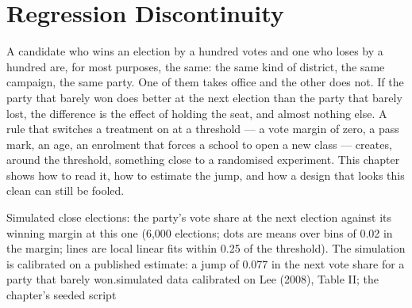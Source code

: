 \chapter{Regression Discontinuity}\label{ch:b3:regression-discontinuity}

A candidate who wins an election by a hundred votes and one who loses by a
hundred are, for most purposes, the same: the same kind of district, the same
campaign, the same party. One of them takes office and the other does not. If
the party that barely won does better at the next election than the party that
barely lost, the difference is the effect of holding the seat, and almost
nothing else. A rule that switches a treatment on at a threshold --- a vote
margin of zero, a pass mark, an age, an enrolment that forces a school to open a
new class --- creates, around the threshold, something close to a randomised
experiment. This chapter shows how to read it, how to estimate the jump, and
how a design that looks this clean can still be fooled.

\begin{openingchart}{Simulated close elections: the party's vote share at the
next election against its winning margin at this one (6{,}000 elections; dots
are means over bins of 0.02 in the margin; lines are local linear fits within
0.25 of the threshold). The simulation is calibrated on a published estimate:
a jump of 0.077 in the next vote share for a party that barely
won.}{simulated data calibrated on Lee (2008), Table II; the chapter's seeded
script}
\end{openingchart}

